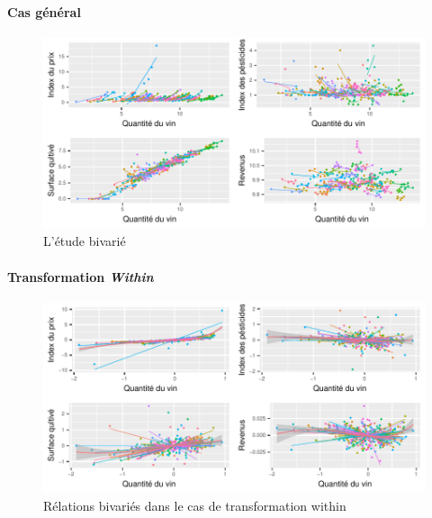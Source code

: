 \documentclass[11pt,]{article}
\let\oldparagraph\paragraph
\renewcommand{\paragraph}[1]{\oldparagraph{#1}\mbox{}}
\begin{document}
\hypertarget{cas-general}{%
\paragraph{Cas général}\label{cas-general}}

\FloatBarrier

\begin{figure}[!htbp]

{\centering \includegraphics{note2pres_files/figure-latex/unnamed-chunk-52-1} 

}

\caption{L'étude bivarié}\label{fig:unnamed-chunk-52}
\end{figure}

\FloatBarrier

\hypertarget{transformation-within}{%
\paragraph{\texorpdfstring{Transformation
\emph{Within}}{Transformation Within}}\label{transformation-within}}

\FloatBarrier

\begin{figure}[!htbp]

{\centering \includegraphics{note2pres_files/figure-latex/unnamed-chunk-53-1} 

}

\caption{Rélations bivariés dans le cas de transformation within}\label{fig:unnamed-chunk-53}
\end{figure}
\end{document}
